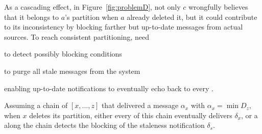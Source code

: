 As a cascading effect, in Figure~\ref{fig:problemD}, not only $c$
wrongfully believes that it belongs to $a$'s partition when $a$
already deleted it, but it could contribute to its inconsistency by
blocking farther but up-to-date messages from actual sources. To reach
consistent partitioning, \processes need
\begin{inparaenum}[(i)]
\item to detect possibly blocking conditions 
\item to purge all stale messages from the system
\item enabling up-to-date notifications to eventually echo back to
  every \process.
\end{inparaenum}

\begin{lemma}
  Assuming a chain of \processes $[x,\ldots, z]$ that delivered a
  message $\alpha_x$ with $\alpha_x = \min D_z$, when $x$ deletes its
  partition, either every \process of this chain eventually delivers
  $\delta_x$, or a \process along the chain detects the blocking of
  the staleness notification $\delta_s$.
\end{lemma}


